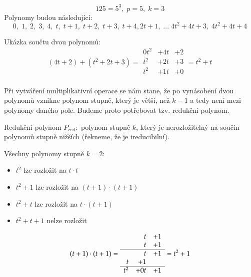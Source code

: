 \begin{example}
    $$125 = 5^3, \; p = 5, \; k = 3$$
    Polynomy budou následující:
    $$0, \; 1, \; 2, \; 3, \; 4, \; t, \; t + 1, \; t + 2, \; t + 3, \; t + 4,
        2t + 1,\; \dots \;4t^2 + 4t + 3, \;  4t^2 + 4t + 4$$

Ukázka součtu dvou polynomů:
\[
    (4t + 2) + (t^2 + 2t + 3)
    =
    \begin{array}{rrr}
        0t^2 & + 4t & + 2\\
        t^2  & + 2t & + 3\\ \hline
        t^2  & + 1t & + 0\\
          &
    \end{array}
= t^2 + t
\]
\end{example}

Při vytváření multiplikativní operace se nám stane, že po vynásobení dvou polynomů
vznikne polynom stupně, který je větší, než $k - 1$ a tedy není mezi polynomy daného pole.
Budeme proto potřebovat tzv. redukční polynom.
\begin{definition}
    Redukční polynom $P_{red}:$ polynom stupně $k$, který je nerozložitelný na součin
    polynomů stupně nižších (řekneme, že je ireducibilní).
\end{definition}


\begin{example}

Všechny polynomy stupně $k=2$:
    \begin{itemize}
        \item $t^2$ lze rozložit na $t \cdot t$
        \item $t^2 + 1$ lze rozložit na $(t + 1) \cdot (t + 1)$
        \item $t^2 + t$ lze rozložit na $t \cdot (t + 1)$
        \item $t^2 + t + 1$ nelze rozložit
    \end{itemize}

\[
    (t + 1) \cdot (t + 1) =
    \begin{array}{rrr}
        &t&+1 \\
        &t&+1 \\ \hline
        &t&+1 \\
        t&+1& \\ \hline
        t^2&+0t&+1
    \end{array}
= t^2 + 1
\]
\end{example}

